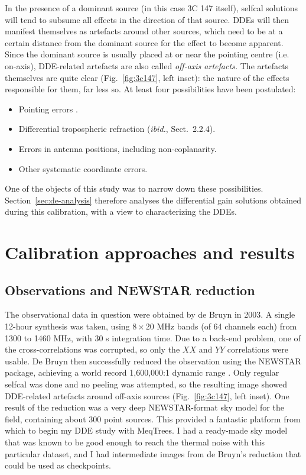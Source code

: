 \documentclass{aa}
\begin{document}
In the presence of a dominant source (in this case 3C 147 itself), selfcal solutions will tend to subsume all effects in the direction of that source. DDEs will then manifest themselves as artefacts around other sources, which need to be at a certain distance from the dominant source for the effect to become apparent. Since the dominant source is usually placed at or near the pointing centre (i.e. on-axis), DDE-related artefacts are also called {\em off-axis artefacts.} The artefacts themselves are quite clear (Fig.~\ref{fig:3c147}, left inset): the nature of the effects responsible for them, far less so. At least four possibilities have been postulated:

\begin{itemize}
\item Pointing errors \citep[Paper II,][Sect.~2.1.4]{RRIME2}.
\item Differential tropospheric refraction ({\em ibid.}, Sect.~2.2.4).
\item Errors in antenna positions, including non-coplanarity.
\item Other systematic coordinate errors.
\end{itemize}

One of the objects of this study was to narrow down these possibilities. Section~\ref{sec:de-analysis} therefore analyses the differential gain solutions obtained during this calibration, with a view to characterizing the DDEs.

\section{Calibration approaches and results}
\label{sec:calibration}

\subsection{Observations and NEWSTAR reduction}

The observational data in question were obtained by de Bruyn in 2003. A single 12-hour synthesis was taken, using $8\times20$ MHz bands (of 64 channels each) from 1300 to 1460 MHz, with 30 s integration time. Due to a back-end problem, one of the cross-correlations was corrupted, so only the $XX$ and $YY$ correlations were usable. De Bruyn then successfully reduced the observation using the NEWSTAR package, achieving a world record 1,600,000:1 dynamic range \citep{deBruyn:3c147}. Only regular selfcal was done and no peeling was attempted, so the resulting image showed DDE-related artefacts around off-axis sources (Fig.~\ref{fig:3c147}, left inset). One result of the reduction was a very deep NEWSTAR-format sky model for the field, containing about 300 point sources. This provided a fantastic platform from which to begin my DDE study with MeqTrees. I had a ready-made sky model that was known to be good enough to reach the thermal noise with this particular dataset, and I had intermediate images from de Bruyn's reduction that could be used as checkpoints.
\end{document}
